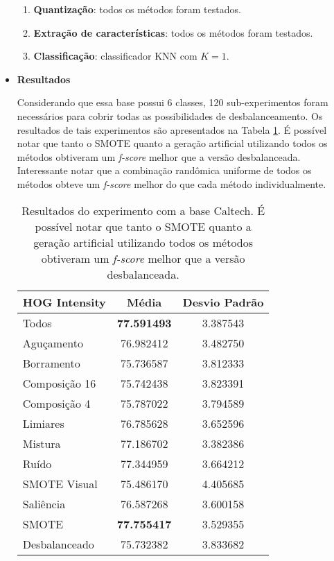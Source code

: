 \begin{itemize}
\begin{enumerate}
\item \textbf{Quantização}: todos os métodos foram testados.
\item \textbf{Extração de características}: todos os métodos foram testados.
\item \textbf{Classificação}: classificador KNN com $K=1$.
\end{enumerate}

\item[] \textbf{Resultados}

Considerando que essa base possui 6 classes, 120 sub-experimentos foram necessários para cobrir todas as possibilidades de desbalanceamento. Os resultados de tais experimentos são apresentados na Tabela \ref{tab:resultados:3.2}. É possível notar que tanto o SMOTE quanto a geração artificial utilizando todos os métodos obtiveram um \textit{f-score} melhor que a versão desbalanceada. Interessante notar que a combinação randômica uniforme de todos os métodos obteve um \textit{f-score} melhor do que cada método individualmente.

\begin{minipage}{\linewidth}
\begin{table}[H]
\begin{center}
\caption{Resultados do experimento com a base Caltech. É possível notar que tanto o SMOTE quanto a geração artificial utilizando todos os métodos obtiveram um \textit{f-score} melhor que a versão desbalanceada.}
\label{tab:resultados:3.2}
\begin{tabular}{|l|c|c|}
\hline
\textbf{HOG Intensity} & \textbf{Média}     & \textbf{Desvio Padrão} \\ \hline
   Todos        &  \textbf{77.591493} &  3.387543  \\ \hline
  Aguçamento    &  76.982412 &  3.482750  \\ \hline
  Borramento    &  75.736587 &  3.812333  \\ \hline
  Composição 16 &  75.742438 &  3.823391  \\ \hline
  Composição 4  &  75.787022 &  3.794589  \\ \hline
  Limiares      &  76.785628 &  3.652596  \\ \hline
  Mistura       &  77.186702 &  3.382386  \\ \hline
  Ruído         &  77.344959 &  3.664212  \\ \hline
  SMOTE Visual  &  75.486170 &  4.405685  \\ \hline
  Saliência     &  76.587268 &  3.600158  \\ \hline
 SMOTE          &  \textbf{77.755417} &  3.529355  \\ \hline
Desbalanceado   &  75.732382 &  3.833682  \\ \hline
\end{tabular}
\end{center}
\end{table}
\end{minipage}


\end{itemize}
